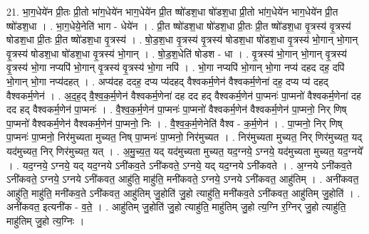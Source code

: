 \documentclass[17pt]{extarticle}
\begin{document}
21. भा॒ग॒धेये॑न प्री॒तः प्री॒तो भा॑ग॒धेये॑न भाग॒धेये॑न प्री॒त ष्षो॑डश॒धा षो॑डश॒धा प्री॒तो भा॑ग॒धेये॑न भाग॒धेये॑न प्री॒त ष्षो॑डश॒धा । . भा॒ग॒धेये॒नेति॑ भाग - धेये॑न । . प्री॒त ष्षो॑डश॒धा षो॑डश॒धा प्री॒तः प्री॒त ष्षो॑डश॒धा वृ॒त्रस्य॑ वृ॒त्रस्य॑ षोडश॒धा प्री॒तः प्री॒त ष्षो॑डश॒धा वृ॒त्रस्य॑ । . षो॒ड॒श॒धा वृ॒त्रस्य॑ वृ॒त्रस्य॑ षोडश॒धा षो॑डश॒धा वृ॒त्रस्य॑ भो॒गान् भो॒गान् वृ॒त्रस्य॑ षोडश॒धा षो॑डश॒धा वृ॒त्रस्य॑ भो॒गान् । . षो॒ड॒श॒धेति॑ षोडश - धा । . वृ॒त्रस्य॑ भो॒गान् भो॒गान् वृ॒त्रस्य॑ वृ॒त्रस्य॑ भो॒गा नप्यपि॑ भो॒गान् वृ॒त्रस्य॑ वृ॒त्रस्य॑ भो॒गा नपि॑ । . भो॒गा नप्यपि॑ भो॒गान् भो॒गा नप्य॑ दहद दह॒ दपि॑ भो॒गान् भो॒गा नप्य॑दहत् । . अप्य॑दह ददह॒ दप्य प्य॑दहद् वैश्वकर्म॒णेन॑ वैश्वकर्म॒णेना॑ दह॒ दप्य प्य॑ दहद् वैश्वकर्म॒णेन॑ । . अ॒द॒ह॒द् वै॒श्व॒क॒र्म॒णेन॑ वैश्वकर्म॒णेना॑ दह दद हद् वैश्वकर्म॒णेन॑ पा॒प्मनः॑ पा॒प्मनो॑ वैश्वकर्म॒णेना॑ दह दद हद् वैश्वकर्म॒णेन॑ पा॒प्मनः॑ । . वै॒श्व॒क॒र्म॒णेन॑ पा॒प्मनः॑ पा॒प्मनो॑ वैश्वकर्म॒णेन॑ वैश्वकर्म॒णेन॑ पा॒प्मनो॒ निर् णिष् पा॒प्मनो॑ वैश्वकर्म॒णेन॑ वैश्वकर्म॒णेन॑ पा॒प्मनो॒ निः । . वै॒श्व॒क॒र्म॒णेनेति॑ वैश्व - क॒र्म॒णेन॑ । . पा॒प्मनो॒ निर् णिष् पा॒प्मनः॑ पा॒प्मनो॒ निर॑मुच्यता मुच्यत॒ निष् पा॒प्मनः॑ पा॒प्मनो॒ निर॑मुच्यत । . निर॑मुच्यता मुच्यत॒ निर् णिर॑मुच्यत॒ यद् यद॑मुच्यत॒ निर् णिर॑मुच्यत॒ यत् । . अ॒मु॒च्य॒त॒ यद् यद॑मुच्यता मुच्यत॒ यद॒ग्नये॒ ऽग्नये॒ यद॑मुच्यता मुच्यत॒ यद॒ग्नये᳚ । . यद॒ग्नये॒ ऽग्नये॒ यद् यद॒ग्नये ऽनी॑कव॒ते ऽनी॑कवते॒ ऽग्नये॒ यद् यद॒ग्नये ऽनी॑कवते । . अ॒ग्नये ऽनी॑कव॒ते ऽनी॑कवते॒ ऽग्नये॒ ऽग्नये ऽनी॑कवत॒ आहु॑ति॒ माहु॑ति॒ मनी॑कवते॒ ऽग्नये॒ ऽग्नये ऽनी॑कवत॒ आहु॑तिम् । . अनी॑कवत॒ आहु॑ति॒ माहु॑ति॒ मनी॑कव॒ते ऽनी॑कवत॒ आहु॑तिम् जु॒होति॑ जु॒हो त्याहु॑ति॒ मनी॑कव॒ते ऽनी॑कवत॒ आहु॑तिम् जु॒होति॑ । . अनी॑कवत॒ इत्यनी॑क - व॒ते॒ । . आहु॑तिम् जु॒होति॑ जु॒हो त्याहु॑ति॒ माहु॑तिम् जु॒हो त्य॒ग्नि र॒ग्निर् जु॒हो त्याहु॑ति॒ माहु॑तिम् जु॒हो त्य॒ग्निः । \newline
\end{document}
